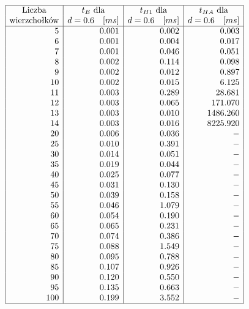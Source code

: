 \documentclass[polish,polish,a4paper]{article}
\begin{document}
\begin{spacing}{1.25}
\begin{spacing}{1.3}
	\begin{equation*}
	\begin{array}{|r|r|r|r|}
	\hline
	\multicolumn{1}{|c|}{$Liczba$}&
	\multicolumn{1}{c|}{t_{E}$ dla$ }&
	\multicolumn{1}{c|}{t_{H1} $ dla$}&
	\multicolumn{1}{c|}{t_{HA}$ dla$}\\
	\multicolumn{1}{|c|}{$wierzchołków$}&
	\multicolumn{1}{c|}{d = 0.6 \quad [ms]}&
	\multicolumn{1}{c|}{d = 0.6 \quad [ms]}&
	\multicolumn{1}{c|}{d = 0.6 \quad [ms]}\\
	\hline
5&0.001&0.002&0.003\\
6&0.001&0.004&0.017\\
7&0.001&0.046&0.051\\
8&0.002&0.114&0.098\\
9&0.002&0.012&0.897\\
10&0.002&0.015&6.125\\
11&0.003&0.289&28.681\\
12&0.003&0.065&171.070\\
13&0.003&0.010&1486.260\\
14&0.003&0.016&8225.920\\
20&0.006&0.036&-\\
25&0.010&0.391&-\\
30&0.014&0.051&-\\
35&0.019&0.044&-\\
40&0.025&0.077&-\\
45&0.031&0.130&-\\
50&0.039&0.158&-\\
55&0.046&1.079&-\\
60&0.054&0.190&-\\
65&0.065&0.231&-\\
70&0.074&0.386&-\\
75&0.088&1.549&-\\
80&0.095&0.788&-\\
85&0.107&0.926&-\\
90&0.120&0.550&-\\
95&0.135&0.663&-\\
100&0.199&3.552&-\\\hline
	\end{array}
	\end{equation*}
\end{spacing}


	\begin{figure}[H]
		\centering

\end{figure}
\end{spacing}
\end{document}
